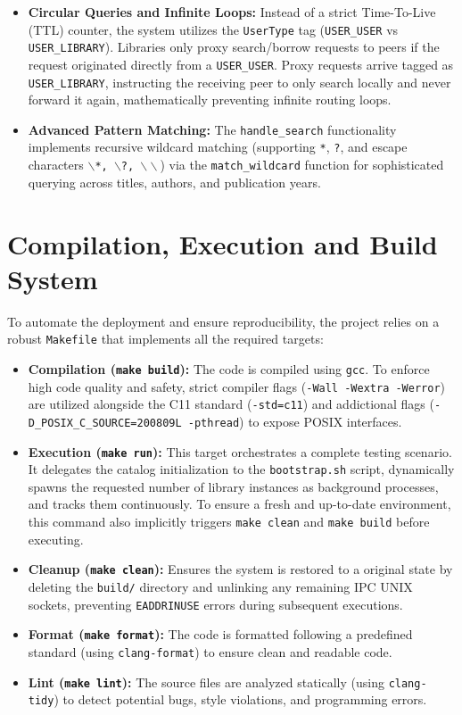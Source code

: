 \documentclass[11pt, a4paper]{article}
\begin{document}
\begin{itemize}[leftmargin=*]
    \item \textbf{Circular Queries and Infinite Loops:} Instead of a strict Time-To-Live (TTL) counter, the system utilizes the \texttt{UserType} tag (\texttt{USER\_USER} vs \texttt{USER\_LIBRARY}). Libraries only proxy search/borrow requests to peers if the request originated directly from a \texttt{USER\_USER}. Proxy requests arrive tagged as \texttt{USER\_LIBRARY}, instructing the receiving peer to only search locally and never forward it again, mathematically preventing infinite routing loops.
    \item \textbf{Advanced Pattern Matching:} The \texttt{handle\_search} functionality implements recursive wildcard matching (supporting \texttt{*}, \texttt{?}, and escape characters \texttt{$\backslash$*, $\backslash$?, $\backslash\backslash$}) via the \texttt{match\_wildcard} function for sophisticated querying across titles, authors, and publication years. 
\end{itemize}

\section{Compilation, Execution and Build System}
To automate the deployment and ensure reproducibility, the project relies on a robust \texttt{Makefile} that implements all the required targets:
\begin{itemize}[leftmargin=*]
    \item \textbf{Compilation (\texttt{make build}):} The code is compiled using \texttt{gcc}. To enforce high code quality and safety, strict compiler flags (\texttt{-Wall -Wextra -Werror}) are utilized alongside the C11 standard (\texttt{-std=c11}) and addictional flags (\texttt{-D\_POSIX\_C\_SOURCE=200809L -pthread}) to expose POSIX interfaces.
    \item \textbf{Execution (\texttt{make run}):} This target orchestrates a complete testing scenario. It delegates the catalog initialization to the \texttt{bootstrap.sh} script, dynamically spawns the requested number of library instances as background processes, and tracks them continuously. To ensure a fresh and up-to-date environment, this command also implicitly triggers \texttt{make clean} and \texttt{make build} before executing.
    \item \textbf{Cleanup (\texttt{make clean}):} Ensures the system is restored to a original state by deleting the \texttt{build/} directory and unlinking any remaining IPC UNIX sockets, preventing \texttt{EADDRINUSE} errors during subsequent executions.
    \item \textbf{Format (\texttt{make format}):} The code is formatted following a predefined standard (using \texttt{clang-format}) to ensure clean and readable code.
    \item \textbf{Lint (\texttt{make lint}):} The source files are analyzed statically (using \texttt{clang-tidy}) to detect potential bugs, style violations, and programming errors.
\end{itemize}
\end{document}
